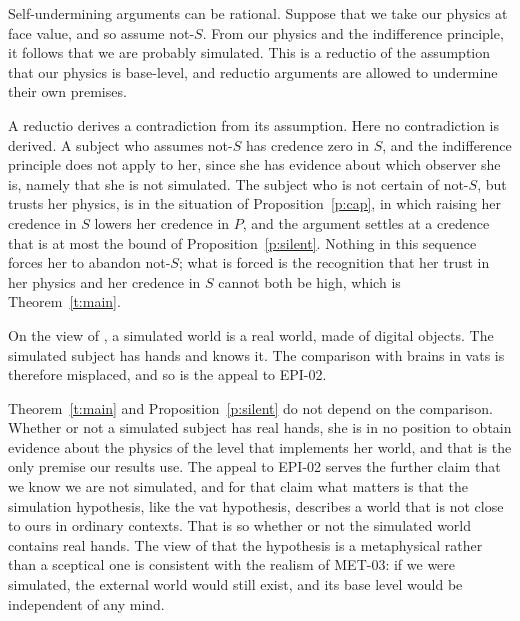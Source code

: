 \documentclass{situationist-preprint}
\begin{document}
\begin{objection}
Self-undermining arguments can be rational. Suppose that we take our physics at face value, and so assume not-$S$. From our physics and the indifference principle, it follows that we are probably simulated. This is a reductio of the assumption that our physics is base-level, and reductio arguments are allowed to undermine their own premises.
\end{objection}

\begin{reply}
A reductio derives a contradiction from its assumption. Here no contradiction is derived. A subject who assumes not-$S$ has credence zero in $S$, and the indifference principle does not apply to her, since she has evidence about which observer she is, namely that she is not simulated. The subject who is not certain of not-$S$, but trusts her physics, is in the situation of Proposition~\ref{p:cap}, in which raising her credence in $S$ lowers her credence in $P$, and the argument settles at a credence that is at most the bound of Proposition~\ref{p:silent}. Nothing in this sequence forces her to abandon not-$S$; what is forced is the recognition that her trust in her physics and her credence in $S$ cannot both be high, which is Theorem~\ref{t:main}.
\end{reply}

\begin{objection}
On the view of \citet{Chalmers2022}, a simulated world is a real world, made of digital objects. The simulated subject has hands and knows it. The comparison with brains in vats is therefore misplaced, and so is the appeal to EPI-02.
\end{objection}

\begin{reply}
Theorem~\ref{t:main} and Proposition~\ref{p:silent} do not depend on the comparison. Whether or not a simulated subject has real hands, she is in no position to obtain evidence about the physics of the level that implements her world, and that is the only premise our results use. The appeal to EPI-02 serves the further claim that we know we are not simulated, and for that claim what matters is that the simulation hypothesis, like the vat hypothesis, describes a world that is not close to ours in ordinary contexts. That is so whether or not the simulated world contains real hands. The view of \citet{Chalmers2005} that the hypothesis is a metaphysical rather than a sceptical one is consistent with the realism of MET-03: if we were simulated, the external world would still exist, and its base level would be independent of any mind.
\end{reply}
\end{document}
